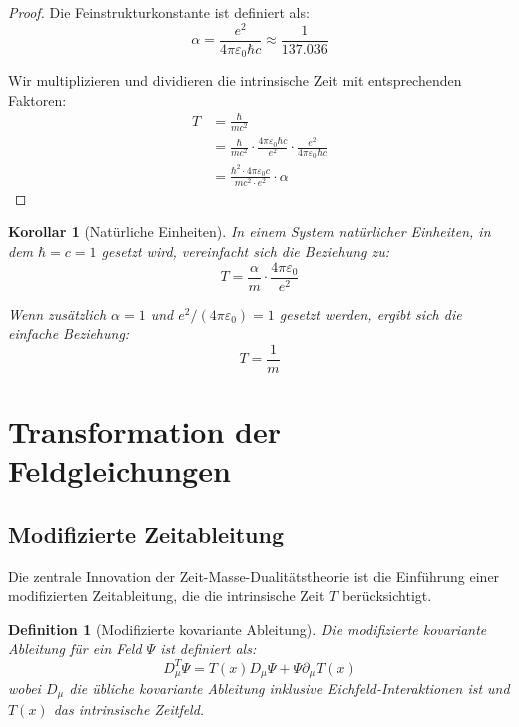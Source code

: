 \documentclass[a4paper,12pt]{article}
\newtheorem{corollary}[theorem]{Korollar}
\newtheorem{definition}{Definition}[section]
\begin{document}
	\begin{proof}
		Die Feinstrukturkonstante ist definiert als:
		\begin{equation}
			\alpha = \frac{e^2}{4\pi \varepsilon_0 \hbar c} \approx \frac{1}{137.036}
		\end{equation}
		
		Wir multiplizieren und dividieren die intrinsische Zeit mit entsprechenden Faktoren:
		\begin{align}
			T &= \frac{\hbar}{m c^2} \\
			&= \frac{\hbar}{m c^2} \cdot \frac{4\pi \varepsilon_0 \hbar c}{e^2} \cdot \frac{e^2}{4\pi \varepsilon_0 \hbar c} \\
			&= \frac{\hbar^2 \cdot 4\pi \varepsilon_0 c}{m c^2 \cdot e^2} \cdot \alpha
		\end{align}
	\end{proof}
	
	\begin{corollary}[Natürliche Einheiten]
		In einem System natürlicher Einheiten, in dem \( \hbar = c = 1 \) gesetzt wird, vereinfacht sich die Beziehung zu:
		\begin{equation}
			T = \frac{\alpha}{m} \cdot \frac{4\pi \varepsilon_0}{e^2}
		\end{equation}
		
		Wenn zusätzlich \( \alpha = 1 \) und \( e^2/(4\pi \varepsilon_0) = 1 \) gesetzt werden, ergibt sich die einfache Beziehung:
		\begin{equation}
			T = \frac{1}{m}
		\end{equation}
	\end{corollary}
	
	\section{Transformation der Feldgleichungen}
	
	\subsection{Modifizierte Zeitableitung}
	
	Die zentrale Innovation der Zeit-Masse-Dualitätstheorie ist die Einführung einer modifizierten Zeitableitung, die die intrinsische Zeit \( T \) berücksichtigt.
	
	\begin{definition}[Modifizierte kovariante Ableitung]
		Die modifizierte kovariante Ableitung für ein Feld \( \Psi \) ist definiert als:
		\begin{equation}
			D_\mu^T \Psi = T(x) D_\mu \Psi + \Psi \partial_\mu T(x)
		\end{equation}
		wobei \( D_\mu \) die übliche kovariante Ableitung inklusive Eichfeld-Interaktionen ist und \( T(x) \) das intrinsische Zeitfeld.
	\end{definition}
	
\end{document}
